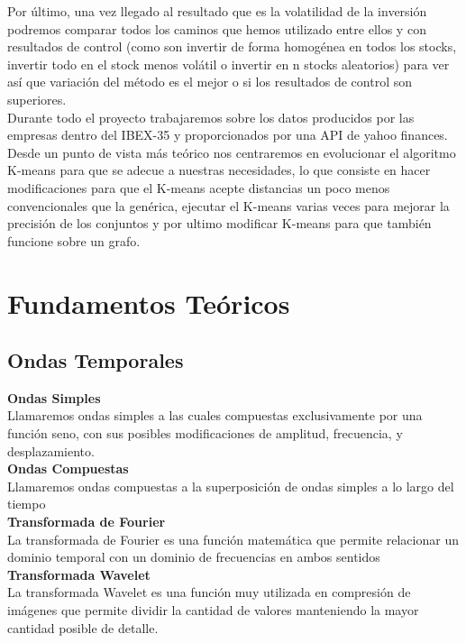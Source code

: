 \documentclass[12pt,a4paper]{article}
\begin{document}
Por último, una vez llegado al resultado que es la volatilidad de la inversión podremos comparar todos los caminos que hemos utilizado entre ellos y con resultados de control (como son invertir de forma homogénea en todos los stocks, invertir todo en el stock menos volátil o invertir en n stocks aleatorios) para ver así que variación del método es el mejor o si los resultados de control son superiores.\\
Durante todo el proyecto trabajaremos sobre los datos producidos por las empresas dentro del IBEX-35 y proporcionados por una API de yahoo finances.\\
Desde un punto de vista más teórico nos centraremos en evolucionar el algoritmo K-means para que se adecue a nuestras necesidades, lo que consiste en hacer modificaciones para que el K-means acepte distancias un poco menos convencionales que la genérica, ejecutar el K-means varias veces para mejorar la precisión de los conjuntos y por ultimo modificar K-means para que también funcione sobre un grafo.\\


	\vspace{1cm}











	\vspace{1cm}
	\section{Fundamentos Teóricos}
	\vspace{1cm}
		\subsection{Ondas Temporales}
			{\textbf{Ondas Simples}}\\
			Llamaremos ondas simples a las cuales compuestas exclusivamente por una función seno, con sus posibles modificaciones de amplitud, frecuencia, y desplazamiento.\\
			{\textbf{Ondas Compuestas}}\\
			Llamaremos ondas compuestas a la superposición de ondas simples a lo largo del tiempo\\
			{\textbf{Transformada de Fourier}}\\
			La transformada de Fourier es una función matemática que permite relacionar un dominio temporal con un dominio de frecuencias en ambos sentidos\\
			{\textbf{Transformada Wavelet}}\\
			La transformada Wavelet es una función muy utilizada en compresión de imágenes que permite dividir la cantidad de valores manteniendo la mayor cantidad posible de detalle.\\
\end{document}
